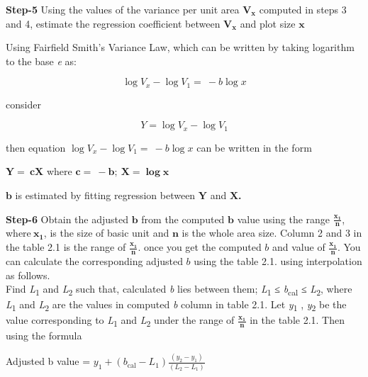 \documentclass[
]{book}
\begin{document}
\textbf{Step-5} Using the values of the variance per unit area
\(\mathbf{V}_{\mathbf{x}}\) computed in steps 3 and 4, estimate the
regression coefficient between \(\mathbf{V}_{\mathbf{x}}\) and plot size
\(\mathbf{x}\)

Using Fairfield Smith's Variance Law, which can be written by taking
logarithm to the base \emph{e} as:

\[\log V_{x} - \log V_{1} = \  - b\log x\]

consider

\[{Y = \log}V_{x} - \log V_{1}\]

then equation \(\log V_{x} - \log V_{1} = \  - b\log x\) can be written in
the form

\(\mathbf{Y = \ cX}\) where
\(\mathbf{c = \  - b;\ X =}\mathbf{\log}\mathbf{x}\)

\(\mathbf{b}\) is estimated by fitting regression between \(\mathbf{Y}\) and
\(\mathbf{X}\)\textbf{.}

\textbf{Step-6} Obtain the adjusted \(\mathbf{b}\) from the computed
\(\mathbf{b}\) value using the range
\(\frac{\mathbf{x}_{\mathbf{1}}}{\mathbf{n}}\),
where\(\mathbf{\ }\mathbf{x}_{\mathbf{1}}\), is the size of basic unit and
\(\mathbf{n}\) is the whole area size. Column 2 and 3 in the table 2.1 is
the range of \(\frac{\mathbf{x}_{\mathbf{1}}}{\mathbf{n}}\). once you get
the computed \(b\) and value of
\(\frac{\mathbf{x}_{\mathbf{1}}}{\mathbf{n}}\). You can calculate the
corresponding adjusted \(b\) using the table 2.1. using interpolation as
follows.\\
Find \emph{L}\textsubscript{1} and \emph{L}\textsubscript{2} such that, calculated \emph{b} lies between them;
\emph{L}\textsubscript{1} ≤ \emph{b}\textsubscript{cal} ≤ \emph{L}\textsubscript{2}, where \emph{L}\textsubscript{1} and \emph{L}\textsubscript{2} are the values in
computed \emph{b} column in table 2.1. Let \emph{y}\textsubscript{1} , \emph{y}\textsubscript{2} be the value
corresponding to \emph{L}\textsubscript{1} and \emph{L}\textsubscript{2} under the range of
\(\frac{\mathbf{x}_{\mathbf{1}}}{\mathbf{n}}\) in the table 2.1. Then
using the formula

Adjusted b value =
\(y_{1} + (b_{\text{cal}} - L_{1})\frac{\left( y_{2} - y_{1} \right)}{\left( L_{2} - L_{1} \right)}\)
\end{document}
